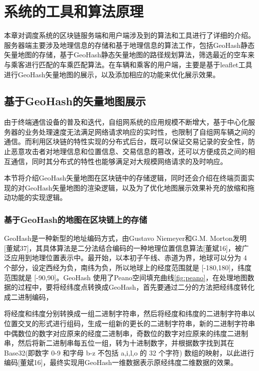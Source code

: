 \chapter{系统的工具和算法原理}

本章对调度系统的区块链服务端和用户端涉及到的算法和工具进行了详细的介绍。服务器端主要涉及地理信息的存储和基于地理信息的算法工作，包括GeoHash静态矢量地图的存储，基于GeoHash静态矢量地图的路径规划算法，筛选最近的空车来与乘客进行匹配的车乘匹配算法。在车辆和乘客的用户端，主要是基于leaflet工具进行GeoHash矢量地图的展示，以及添加相应的功能来优化展示效果。

\section{基于GeoHash的矢量地图展示}

由于终端通信设备的普及和迭代，自组网系统的应用规模不断增大，基于中心化服务器的业务处理速度无法满足网络请求响应的实时性，也限制了自组网车辆之间的通信。而利用区块链的特性实现的分布式后台，既可以保证交易记录的安全性，防止恶意攻击者对地理信息和位置信息、交易信息的篡改，还可以方便成员之间的相互通信，同时其分布式的特性也能够满足对大规模网络请求的及时响应。

本节将介绍GeoHash矢量地图在区块链中的存储逻辑，同时还会介绍在终端页面实现的对GeoHash矢量地图的渲染逻辑，以及为了优化地图展示效果补充的放缩和拖动功能的实现逻辑。

\subsection{基于GeoHash的地图在区块链上的存储}

GeoHash是一种新型的地址编码方式，由Gustavo Niemeyer和G.M. Morton发明[董斌37]，其具体算法是二分法结合编码的一种地理位置信息算法[董斌16]，被广泛应用到地理位置表示中。最开始，以本初子午线、赤道为界，地球可以分为 4 个部分，设定西经为负，南纬为负，所以地球上的经度范围就是 [-180,180]，纬度范围就是 [-90,90]。GeoHash 使用了Peano空间填充曲线\ref{fig:peano}，在处理地图数据的过程中，要将经纬度点转换成GeoHash，首先要通过二分的方法把经纬度转化成二进制编码，


将经度和纬度分别转换成一组二进制字符串，然后将经度和纬度的二进制字符串以位置交叉的形式进行组码，生成一组新的更长的二进制字符串，新的二进制字符串中偶数位的数字对应原来的经度二进制串，奇数位的数字对应原来的纬度二进制串，然后将新二进制串每五位一组，转为十进制数字，并根据数字找到其在Base32(即数字 0-9 和字母 b-z 不包括 a,i,l,o 的 32 个字符) 数组的映射，以此进行编码[董斌16]，最终实现用GeoHash一维数据表示原经纬度二维数据的效果。


